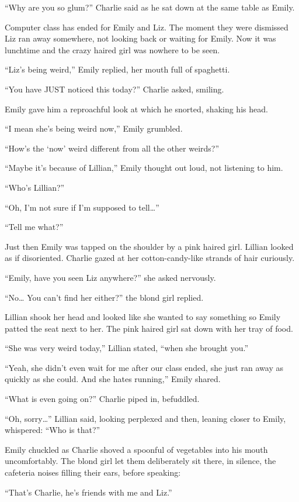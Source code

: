 “Why are you so glum?” Charlie said as he sat down at the same table as Emily.

Computer class has ended for Emily and Liz. The moment they were dismissed Liz ran away somewhere, not looking back or waiting for Emily. Now it was lunchtime and the crazy haired girl was nowhere to be seen.

“Liz’s being weird,” Emily replied, her mouth full of spaghetti.

“You have JUST noticed this today?” Charlie asked, smiling.

Emily gave him a reproachful look at which he snorted, shaking his head.

“I mean she’s being weird now,” Emily grumbled.

“How’s the ‘now’ weird different from all the other weirds?”

“Maybe it’s because of Lillian,” Emily thought out loud, not listening to him.

“Who’s Lillian?”

“Oh, I’m not sure if I’m supposed to tell…”

“Tell me what?”

Just then Emily was tapped on the shoulder by a pink haired girl. Lillian looked as if disoriented. Charlie gazed at her cotton-candy-like strands of hair curiously.

“Emily, have you seen Liz anywhere?” she asked nervously.

“No… You can’t find her either?” the blond girl replied.

Lillian shook her head and looked like she wanted to say something so Emily patted the seat next to her. The pink haired girl sat down with her tray of food.

“She was very weird today,” Lillian stated, “when she brought you.”

“Yeah, she didn’t even wait for me after our class ended, she just ran away as quickly as she could. And she hates running,” Emily shared.

“What is even going on?” Charlie piped in, befuddled.

“Oh, sorry…” Lillian said, looking perplexed and then, leaning closer to Emily, whispered: “Who is that?”

Emily chuckled as Charlie shoved a spoonful of vegetables into his mouth uncomfortably. The blond girl let them deliberately sit there, in silence, the cafeteria noises filling their ears, before speaking:

“That’s Charlie, he’s friends with me and Liz.”

